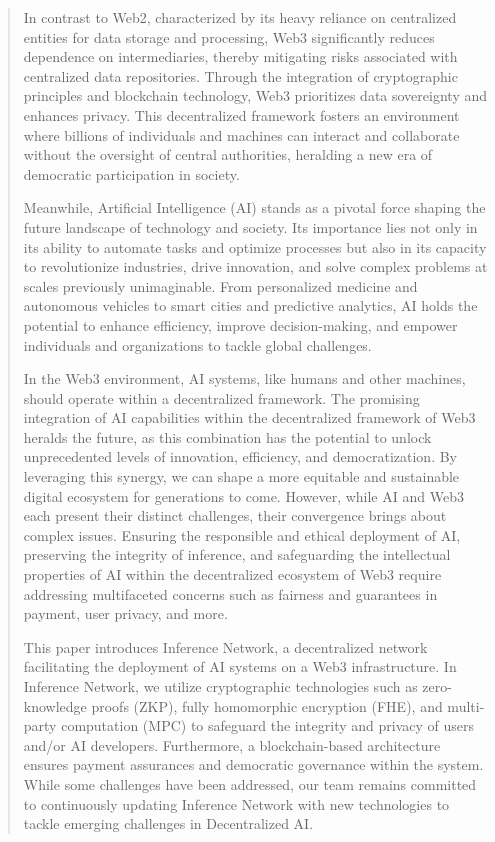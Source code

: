\documentclass[conference]{IEEEtran}
\begin{document}
\begin{abstract}
In contrast to Web2, characterized by its heavy reliance on centralized entities for data storage and processing, Web3 significantly reduces dependence on intermediaries, thereby mitigating risks associated with centralized data repositories. Through the integration of cryptographic principles and blockchain technology, Web3 prioritizes data sovereignty and enhances privacy. This decentralized framework fosters an environment where billions of individuals and machines can interact and collaborate without the oversight of central authorities, heralding a new era of democratic participation in society.

Meanwhile, Artificial Intelligence (AI) stands as a pivotal force shaping the future landscape of technology and society. Its importance lies not only in its ability to automate tasks and optimize processes but also in its capacity to revolutionize industries, drive innovation, and solve complex problems at scales previously unimaginable. From personalized medicine and autonomous vehicles to smart cities and predictive analytics, AI holds the potential to enhance efficiency, improve decision-making, and empower individuals and organizations to tackle global challenges.

In the Web3 environment, AI systems, like humans and other machines, should operate within a decentralized framework. The promising integration of AI capabilities within the decentralized framework of Web3 heralds the future, as this combination has the potential to unlock unprecedented levels of innovation, efficiency, and democratization. By leveraging this synergy, we can shape a more equitable and sustainable digital ecosystem for generations to come. However, while AI and Web3 each present their distinct challenges, their convergence brings about complex issues. Ensuring the responsible and ethical deployment of AI, preserving the integrity of inference, and safeguarding the intellectual properties of AI within the decentralized ecosystem of Web3 require addressing multifaceted concerns such as fairness and guarantees in payment, user privacy, and more.

This paper introduces Inference Network, a decentralized network facilitating the deployment of AI systems on a Web3 infrastructure. In Inference Network, we utilize cryptographic technologies such as zero-knowledge proofs (ZKP), fully homomorphic encryption (FHE), and multi-party computation (MPC) to safeguard the integrity and privacy of users and/or AI developers. Furthermore, a blockchain-based architecture ensures payment assurances and democratic governance within the system. While some challenges have been addressed, our team remains committed to continuously updating Inference Network with new technologies to tackle emerging challenges in Decentralized AI.


\end{abstract}
\end{document}

